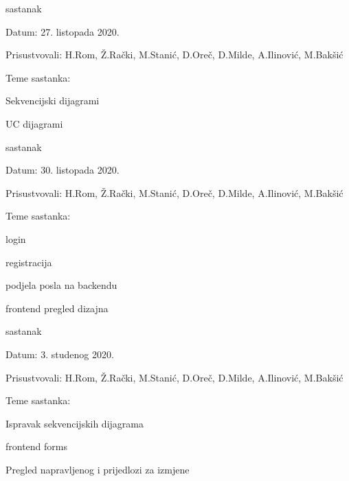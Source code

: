 \begin{packed_enum}
	        \item  sastanak 
	        \item[] \begin{packed_item}
	        	\item Datum: 27. listopada 2020.
	        	\item Prisustvovali: H.Rom, Ž.Rački, M.Stanić, D.Oreč, D.Milde, A.Ilinović, M.Bakšić
	        	\item Teme sastanka:
	        	\begin{packed_item}
	        		\item  Sekvencijski dijagrami
	        		\item  UC dijagrami
	        	\end{packed_item}
	        \end{packed_item}
        
	        \item  sastanak 
	        \item[] \begin{packed_item}
	        	\item Datum: 30. listopada 2020.
	        	\item Prisustvovali: H.Rom, Ž.Rački, M.Stanić, D.Oreč, D.Milde, A.Ilinović, M.Bakšić
	        	\item Teme sastanka:
	        	\begin{packed_item}
	        		\item  login
	        		\item  registracija
	        		\item  podjela posla na backendu
	        		\item  frontend pregled dizajna
	        	\end{packed_item}
	        \end{packed_item}
        
        	\item  sastanak 
        	\item[] \begin{packed_item}
        		\item Datum: 3. studenog 2020.
        		\item Prisustvovali: H.Rom, Ž.Rački, M.Stanić, D.Oreč, D.Milde, A.Ilinović, M.Bakšić
        		\item Teme sastanka:
        		\begin{packed_item}
        			\item  Ispravak sekvencijskih dijagrama
        			\item  frontend forms
        			\item  Pregled napravljenog i prijedlozi za izmjene
        		\end{packed_item}
        	\end{packed_item}
        

\end{packed_enum}
